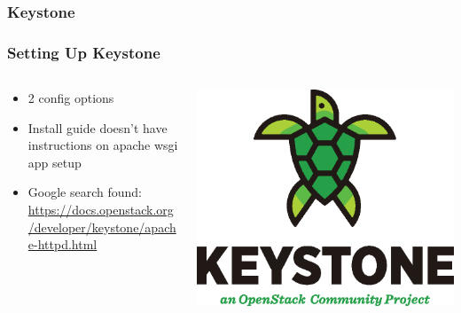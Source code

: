 \documentclass[aspectratio=169,11pt,hyperref={colorlinks=true}]{beamer}
\begin{document}
\subsubsection{Keystone}
\begin{frame}
    \frametitle{Setting Up Keystone}
    \begin{columns}[T]
        \begin{column}{.48\textwidth}
            \begin{itemize}
                \item 2 config options
                \item Install guide doesn't have instructions on
                    apache wsgi app setup
                \item Google search found: \href{https://docs.openstack.org/developer/keystone/apache-httpd.html}{https://docs.openstack.org/developer/keystone/apache-httpd.html}
            \end{itemize}
        \end{column}
        \begin{column}{.48\textwidth}
            \includegraphics[width=\textwidth]{mascots/keystone.eps}
        \end{column}
    \end{columns}
\end{frame}

\begin{frame}
    
\end{frame}
\end{document}
